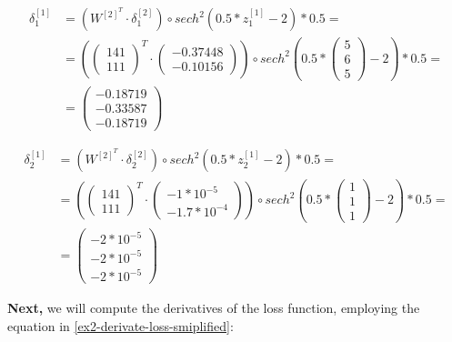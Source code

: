 \documentclass[12pt]{article}
\begin{document}
\begin{enumerate}[leftmargin=\labelsep]
          \begin{align*}
            \delta^{[1]}_1 &= (W^{[2]^{T}} \cdot \delta^{[2]}_1) \circ  sech^{2}(0.5*z^{[1]}_1 - 2) * 0.5 = \\
             &= (\begin{pmatrix} 1 4 1 \\ 1 1 1 \end{pmatrix}^{T} \cdot \begin{pmatrix} -0.37448 \\ -0.10156 \end{pmatrix}) \circ sech^{2}(0.5*\begin{pmatrix}  5 \\ 6 \\ 5 \end{pmatrix} - 2) * 0.5 = \\
             &= \begin{pmatrix} -0.18719 \\ -0.33587 \\ -0.18719\end{pmatrix}
          \end{align*}

          \begin{align*}
            \delta^{[1]}_2 &= (W^{[2]^{T}} \cdot \delta^{[2]}_2) \circ  sech^{2}(0.5*z^{[1]}_2 - 2) * 0.5 = \\
             &= (\begin{pmatrix} 1 4 1 \\ 1 1 1 \end{pmatrix}^{T} \cdot \begin{pmatrix} -1 * 10^{-5} \\ -1.7 * 10^{-4} \end{pmatrix}) \circ sech^{2}(0.5*\begin{pmatrix}  1 \\ 1 \\ 1 \end{pmatrix} - 2) * 0.5 = \\
             &= \begin{pmatrix} -2 * 10^{-5} \\ -2 * 10^{-5} \\ -2 * 10^{-5}\end{pmatrix}
          \end{align*}

          \textbf{Next,} we will compute the derivatives of the loss function, employing the equation in \ref{ex2-derivate-loss-smiplified}:


\end{enumerate}
\end{document}
